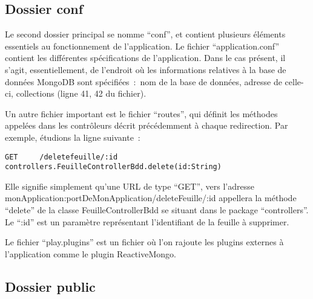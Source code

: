 \subsection{Dossier conf}

Le second dossier principal se nomme \enquote{conf}, et contient plusieurs éléments essentiels au fonctionnement de l'application. Le fichier \enquote{application.conf} contient les différentes spécifications de l'application. Dans le cas présent, il s'agit, essentiellement, de l'endroit où les informations relatives à la base de données MongoDB sont spécifiées~:~nom de la base de données, adresse de celle-ci, collections (ligne 41, 42 du fichier). 

Un autre fichier important est le fichier \enquote{routes}, qui définit les méthodes appelées dans les contrôleurs décrit précédemment à chaque redirection. Par exemple, étudions la ligne suivante~:

\begin{verbatim}
GET     /deletefeuille/:id  controllers.FeuilleControllerBdd.delete(id:String)
\end{verbatim}

Elle signifie simplement qu'une URL de type \enquote{GET}, vers l’adresse monApplication:portDeMonApplication/deleteFeuille/:id appellera la méthode \enquote{delete} de la classe FeuilleControllerBdd se situant dans le package \enquote{controllers}. Le \enquote{:id} est un paramètre représentant l'identifiant de la feuille à supprimer.

Le fichier \enquote{play.plugins} est un fichier où l'on rajoute les plugins externes à l'application comme le plugin ReactiveMongo. 

\subsection{Dossier public}

